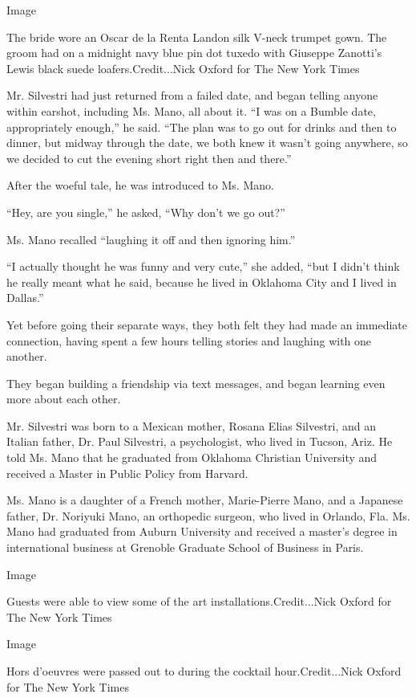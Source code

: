 Image

The bride wore an Oscar de la Renta Landon silk V-neck trumpet gown. The
groom had on a midnight navy blue pin dot tuxedo with Giuseppe Zanotti's
Lewis black suede loafers.Credit...Nick Oxford for The New York Times

Mr. Silvestri had just returned from a failed date, and began telling
anyone within earshot, including Ms. Mano, all about it. ``I was on a
Bumble date, appropriately enough,'' he said. ``The plan was to go out
for drinks and then to dinner, but midway through the date, we both knew
it wasn't going anywhere, so we decided to cut the evening short right
then and there.''

After the woeful tale, he was introduced to Ms. Mano.

``Hey, are you single,'' he asked, ``Why don't we go out?''

Ms. Mano recalled ``laughing it off and then ignoring him.''

``I actually thought he was funny and very cute,'' she added, ``but I
didn't think he really meant what he said, because he lived in Oklahoma
City and I lived in Dallas.''

Yet before going their separate ways, they both felt they had made an
immediate connection, having spent a few hours telling stories and
laughing with one another.

They began building a friendship via text messages, and began learning
even more about each other.

Mr. Silvestri was born to a Mexican mother, Rosana Elias Silvestri, and
an Italian father, Dr. Paul Silvestri, a psychologist, who lived in
Tucson, Ariz. He told Ms. Mano that he graduated from Oklahoma Christian
University and received a Master in Public Policy from Harvard.

Ms. Mano is a daughter of a French mother, Marie-Pierre Mano, and a
Japanese father, Dr. Noriyuki Mano, an orthopedic surgeon, who lived in
Orlando, Fla. Ms. Mano had graduated from Auburn University and received
a master's degree in international business at Grenoble Graduate School
of Business in Paris.

Image

Guests were able to view some of the art installations.Credit...Nick
Oxford for The New York Times

Image

Hors d'oeuvres were passed out to during the cocktail hour.Credit...Nick
Oxford for The New York Times


